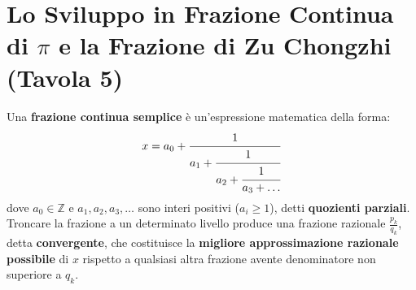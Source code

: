 \documentclass[11pt,a4paper,oneside]{report}
\begin{document}
\section{Lo Sviluppo in Frazione Continua di \texorpdfstring{$\pi$}{pi} e la Frazione di Zu Chongzhi (Tavola 5)}

\begin{definizione}
Una \textbf{frazione continua semplice} \`e un'espressione matematica della forma:
\begin{equation}
    x = a_0 + \cfrac{1}{a_1 + \cfrac{1}{a_2 + \cfrac{1}{a_3 + \dots}}}
\end{equation}
dove $a_0 \in \mathbb{Z}$ e $a_1, a_2, a_3, \dots$ sono interi positivi ($a_i \ge 1$), detti \textbf{quozienti parziali}. Troncare la frazione a un determinato livello produce una frazione razionale $\frac{p_k}{q_k}$, detta \textbf{convergente}, che costituisce la \textbf{migliore approssimazione razionale possibile} di $x$ rispetto a qualsiasi altra frazione avente denominatore non superiore a $q_k$.
\end{definizione}
\end{document}
